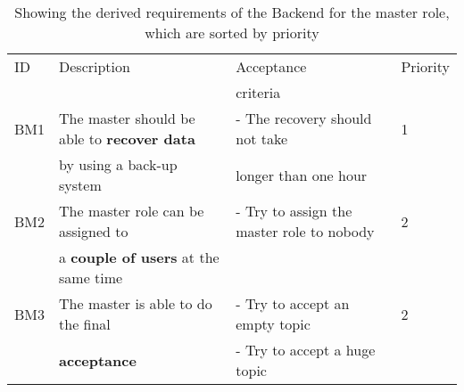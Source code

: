 \documentclass[twoside,openright,fleqn,pointlessnumbers,headinclude,,11pt,a4paper,BCOR5mm,footinclude,cleardoubleempty,abstracton %
                ]{scrreprt}
\begin{document}
	\begin{table}[h]
			\caption{Showing the derived requirements of the Backend for the master role, which are sorted by priority}
	\centering%
	\begin{tabular}{llll}
			\hline
	ID 	& Description 	& Acceptance 	& Priority \\
	 	& 			 & criteria 	&  \\
		\hline
	BM1 & The master should be able to \textbf{recover data} 	& - The recovery should not take & 1	\\
	 	& by using a back-up system					& longer than one hour & 		\\
	\hline
	BM2 & The master role can be assigned to 				& - Try to assign the master role to nobody & 2	\\
	 	& a \textbf{couple of users} at the same time 			&  & 	\\
	\hline
	BM3 & The master is able to do the final  				& - Try to accept an empty topic & 2\\
	 	& \textbf{acceptance} 							& - Try to accept a huge topic & \\
			\hline
	\end{tabular}
	\label{RequirementsBackendMaster}
	\end{table}
\end{document}
